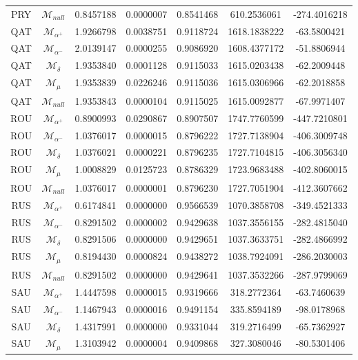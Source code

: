 \begin{tabular}{ccccccc}
PRY & $\mathcal{M}_{null}$ & 0.8457188 & 0.0000007 & 0.8541468 & 610.2536061 & -274.4016218\\
QAT & $\mathcal{M}_{\alpha^+}$ & 1.9266798 & 0.0038751 & 0.9118724 & 1618.1838222 & -63.5800421\\
QAT & $\mathcal{M}_{\alpha^-}$ & 2.0139147 & 0.0000255 & 0.9086920 & 1608.4377172 & -51.8806944\\
QAT & $\mathcal{M}_{\delta}$ & 1.9353840 & 0.0001128 & 0.9115033 & 1615.0203438 & -62.2009448\\
QAT & $\mathcal{M}_{\mu}$ & 1.9353839 & 0.0226246 & 0.9115036 & 1615.0306966 & -62.2018858\\
QAT & $\mathcal{M}_{null}$ & 1.9353843 & 0.0000104 & 0.9115025 & 1615.0092877 & -67.9971407\\
ROU & $\mathcal{M}_{\alpha^+}$ & 0.8900993 & 0.0290867 & 0.8907507 & 1747.7760599 & -447.7210801\\
ROU & $\mathcal{M}_{\alpha^-}$ & 1.0376017 & 0.0000015 & 0.8796222 & 1727.7138904 & -406.3009748\\
ROU & $\mathcal{M}_{\delta}$ & 1.0376021 & 0.0000221 & 0.8796235 & 1727.7104815 & -406.3056340\\
ROU & $\mathcal{M}_{\mu}$ & 1.0008829 & 0.0125723 & 0.8786329 & 1723.9683488 & -402.8060015\\
ROU & $\mathcal{M}_{null}$ & 1.0376017 & 0.0000001 & 0.8796230 & 1727.7051904 & -412.3607662\\
RUS & $\mathcal{M}_{\alpha^+}$ & 0.6174841 & 0.0000000 & 0.9566539 & 1070.3858708 & -349.4521333\\
RUS & $\mathcal{M}_{\alpha^-}$ & 0.8291502 & 0.0000002 & 0.9429638 & 1037.3556155 & -282.4815040\\
RUS & $\mathcal{M}_{\delta}$ & 0.8291506 & 0.0000000 & 0.9429651 & 1037.3633751 & -282.4866992\\
RUS & $\mathcal{M}_{\mu}$ & 0.8194430 & 0.0000824 & 0.9438272 & 1038.7924091 & -286.2030003\\
RUS & $\mathcal{M}_{null}$ & 0.8291502 & 0.0000000 & 0.9429641 & 1037.3532266 & -287.9799069\\
SAU & $\mathcal{M}_{\alpha^+}$ & 1.4447598 & 0.0000015 & 0.9319666 & 318.2772364 & -63.7460639\\
SAU & $\mathcal{M}_{\alpha^-}$ & 1.1467943 & 0.0000016 & 0.9491154 & 335.8594189 & -98.0178968\\
SAU & $\mathcal{M}_{\delta}$ & 1.4317991 & 0.0000000 & 0.9331044 & 319.2716499 & -65.7362927\\
SAU & $\mathcal{M}_{\mu}$ & 1.3103942 & 0.0000004 & 0.9409868 & 327.3080046 & -80.5301406\\

\end{tabular}
